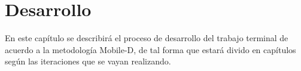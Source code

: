 \chapter{Desarrollo}

En este capítulo se describirá el proceso de desarrollo del trabajo terminal de acuerdo a la metodología Mobile-D, de tal forma que estará divido en capítulos según las iteraciones que se vayan realizando.\par